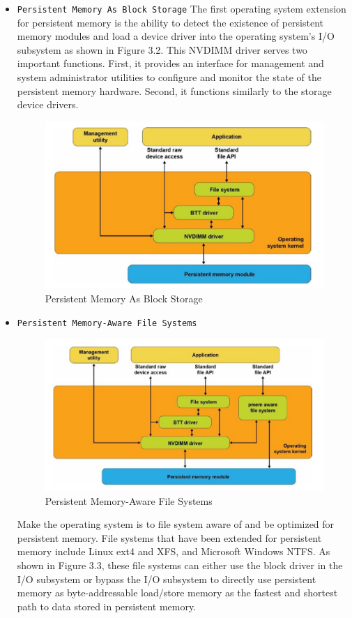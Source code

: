 \documentclass[11pt,swedish, openany, oneside]{book}
\begin{document}
\begin{itemize}
    \item \texttt{Persistent Memory As Block Storage}
    The first operating system extension for persistent memory is the ability to detect the existence of persistent memory modules and load a device driver into the operating system's I/O subsystem as shown in Figure 3.2. This NVDIMM driver serves two important functions. First, it provides an interface for management and system administrator utilities to configure and monitor the state of the persistent memory hardware. Second, it functions similarly to the storage device drivers.\cite{Scargall2020}
    \begin{figure}[H]
       \centering
       \includegraphics[width=0.6\linewidth]{oss2.png}
       \caption{Persistent Memory As Block Storage \cite{Scargall2020}}
    \end{figure}

    \item \texttt{Persistent Memory-Aware File Systems}
    \begin{figure}[H]
       \centering
       \includegraphics[width=0.6\linewidth]{oss3.png}
       \caption{Persistent Memory-Aware File Systems \cite{Scargall2020}}
    \end{figure}

    Make the operating system is to file system aware of and be optimized for persistent memory. File systems that have been extended for persistent memory include Linux ext4 and XFS, and Microsoft Windows NTFS. As shown in Figure 3.3, these file systems can either use the block driver in the I/O subsystem or bypass the I/O subsystem to directly use persistent memory as byte-addressable load/store memory as the fastest and shortest path to data stored in persistent memory.


\end{itemize}
\end{document}
